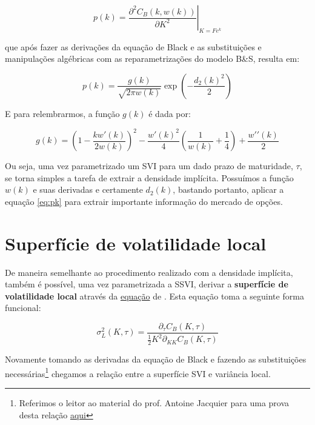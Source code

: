 \documentclass[]{book}
\let\rmarkdownfootnote\footnote%
\def\footnote{\protect\rmarkdownfootnote}
\theoremstyle{definition}
\theoremstyle{definition}
\theoremstyle{definition}
\theoremstyle{remark}
\begin{document}
\begin{equation}
p(k)=\left.\frac{\partial^2C_B(k, w(k))}{\partial K^2}\right|_{K=Fe^k} 
\end{equation}

que após fazer as derivações da equação de Black e as substituições e
manipulações algébricas com as reparametrizações do modelo B\&S, resulta
em:

\begin{equation}
p(k)=\frac{g(k)}{\sqrt{2\pi w(k)}}\exp\left(-\frac{d_2(k)^2}{2}\right)
\label{eq:pk}
\end{equation}

E para relembrarmos, a função \(g(k)\) é dada por:

\begin{equation}
g(k)=\left(1-\frac{kw\prime(k)}{2w(k)}\right)^2-\frac{w\prime(k)^2}{4}\left(\frac{1}{w(k)}+\frac{1}{4}\right)+\frac{w\prime\prime(k)}{2}
\label{eq:g}
\end{equation}

Ou seja, uma vez parametrizado um SVI para um dado prazo de maturidade,
\(\tau\), se torna simples a tarefa de extrair a densidade implícita.
Possuímos a função \(w(k)\) e suas derivadas e certamente \(d_2(k)\),
bastando portanto, aplicar a equação \eqref{eq:pk} para extrair importante
informação do mercado de opções.

\section{Superfície de volatilidade
local}\label{superficie-de-volatilidade-local}

De maneira semelhante ao procedimento realizado com a densidade
implícita, também é possível, uma vez parametrizada a SSVI, derivar a
\textbf{superfície de volatilidade local} através da
\protect\hyperlink{superficies}{equação} de \citep{Dupire1994}. Esta
equação toma a seguinte forma funcional:

\begin{equation}
\sigma_L^2(K, \tau)=\frac{\partial_\tau C_B(K, \tau)}{\frac{1}{2}K^2\partial_{KK}C_B(K, \tau)}
\label{eq:dupire}
\end{equation}

Novamente tomando as derivadas da equação de Black e fazendo as
substituições necessárias\footnote{Referimos o leitor ao material do
  prof. Antoine Jacquier para uma prova desta relação
  \href{http://wwwf.imperial.ac.uk/~ajacquie/IC_AMDP/IC_AMDP_Docs/AMDP.pdf}{aqui}}
chegamos a relação entre a superfície SVI e variância local.
\end{document}
